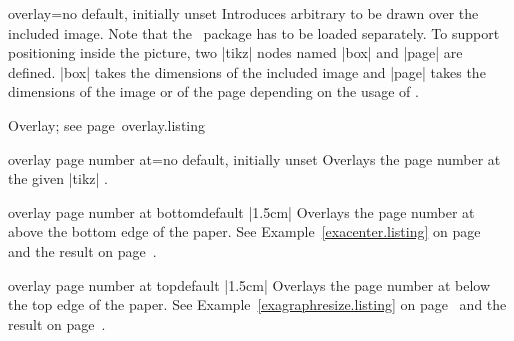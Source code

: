 \documentclass[a4paper,11pt]{ltxdoc}
\begin{document}
\begin{docIgrKey}{overlay}{=}{no default, initially unset}
  Introduces arbitrary  to be drawn over the included image.
  Note that the \tikzname\ package \cite{tantau:tikz} has to be loaded separately.
  To support positioning inside the picture, two |tikz| nodes named
  |box| and |page| are defined. |box| takes the dimensions of the included image
  and |page| takes the dimensions of the image or of the page depending on the usage of
  .
\begin{texexptitled}%
  {Overlay; see page~\pageref{overlay}}{overlay.listing}
\end{texexptitled}
\end{docIgrKey}

\begin{docIgrKey}{overlay page number at}{=}{no default, initially unset}
  Overlays the page number at the given |tikz| .
\end{docIgrKey}

\begin{docIgrKey}{overlay page number at bottom}{}{default |1.5cm|}
  Overlays the page number at  above the bottom edge of the paper.
  See Example~\ref{exacenter.listing} on page~\pageref{exacenter.listing}
  and the result on page~\pageref{exacenter}.
\end{docIgrKey}

\begin{docIgrKey}{overlay page number at top}{}{default |1.5cm|}
  Overlays the page number at  below the top edge of the paper.
  See Example~\ref{exagraphresize.listing} on page~\pageref{exagraphresize.listing}
  and the result on page~\pageref{exagraphresize}.
\end{docIgrKey}
\end{document}
